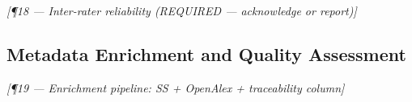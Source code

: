 \bigskip\noindent\textit{[¶18 — Inter-rater reliability (REQUIRED — acknowledge or report)]}


\subsection{Metadata Enrichment and Quality Assessment}
\label{sec:methodology:enrichment}



\bigskip\noindent\textit{[¶19 — Enrichment pipeline: SS + OpenAlex + traceability column]}


